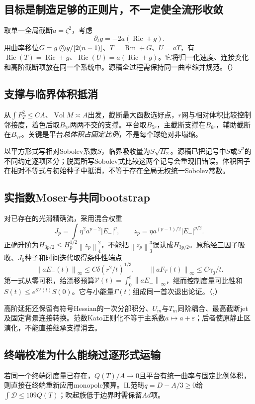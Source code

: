 \documentclass[UTF8,fontset=fandol,zihao=-4]{ctexart}
\theoremstyle{research}
\DeclareMathOperator{\Ric}{Ric}
\DeclareMathOperator{\Rm}{Rm}
\DeclareMathOperator{\Vol}{Vol}
\newcommand{\norm}[1]{\left\|#1\right\|}
\newcommand{\Dcal}{\mathcal D}
\newcommand{\owedge}{\mathbin{\bigcirc\mkern-15mu\wedge}}
\numberwithin{equation}{section}
\begin{document}
\subsection{目标是制造足够的正则片，不一定使全流形收敛}
取单一全局截断$a=\zeta^2$，考虑
\[
\partial_tg=-2a(\Ric+g).
\]
用曲率移位$G=g\owedge g/[2(n-1)]$、$T=\Rm+G$、$U=aT$，有$\Ric(T)=\Ric+g$、$\Ric(U)=a(\Ric+g)$。它将归一化速度、连接变化和高阶截断项放在同一个系统中。源稿全过程需保持同一曲率缩并规范。\cite{R}（）

\subsection{支撑与临界体积抵消}
从$\int F_T^2\le CA$、$\Vol M\asymp A$出发，截断最大函数选好点，$r$网与相对体积比较控制邻接度，着色后取$B_{7r}$两两不交的支撑。平台取$B_{5r}$，主截断支撑在$B_{6r}$，辅助截断在$B_{7r}$。关键是平台\emph{总体积占固定比例}，不是每个球绝对非塌缩。

以平方形式写相对Sobolev系数$S$，临界吸收量为$S\sqrt{H_2}$。源稿已把记号中$S$或$S^2$的不同约定逐项区分；脱离所写Sobolev式比较这两个记号会重现旧错误。体积因子在相对不等式与初始种子中抵消，不等于存在全局无权统一Sobolev常数。

\subsection{实指数Moser与共同bootstrap}
对已存在的光滑精确流，采用混合权重
\[
J_p=\int\eta^2a^{p-2}|E_-|^p,\qquad
z_p=\eta a^{(p-1)/2}|E_-|^{p/2}.
\]
正确升阶为$H_{3p/2}\le H_p^{1/2}\norm{z_p}_4^2$，不能把$\norm{z_p}_3^3$误认成$H_{3p/2}$。原稿经三因子吸收、$J_6$种子和时间迭代取得条件性端点
\[
\norm{aE_-(t)}_\infty\le C\delta(r^2/t)^{1/3},\qquad
\norm{aF_T(t)}_\infty\le C\gamma_0/t.
\]
第一式从零可积，给漂移预算$\mathcal V(t)=\int_0^t\norm{aE_-}_\infty$，继而控制度量可比性和$S(t)\le e^{8\mathcal V(t)}S(0)$。它与小能量$\Gamma(t)$组成同一首次退出论证。\cite{R}（,）

高阶延拓还保留有符号Hessian的一次分部积分、$U_m$与$T_m$同阶耦合、最高截断jet及固定背景连接转换。范数Kato正则化不等于主系数$a\mapsto a+\varepsilon$；后者使原静止区演化，不能直接继承支撑消去。

\subsection{终端校准为什么能绕过逐形式运输}
若同一个终端闭度量已存在，$Q(T)/A\to0$且平台有统一曲率与固定比例体积，则直接在终端重新应用monopole预算。IL范畴$q=D-A/3\ge0$给$\int\Dcal\le109Q(T)$；吹起族低于边界时需保留$Ad$项。
\end{document}

